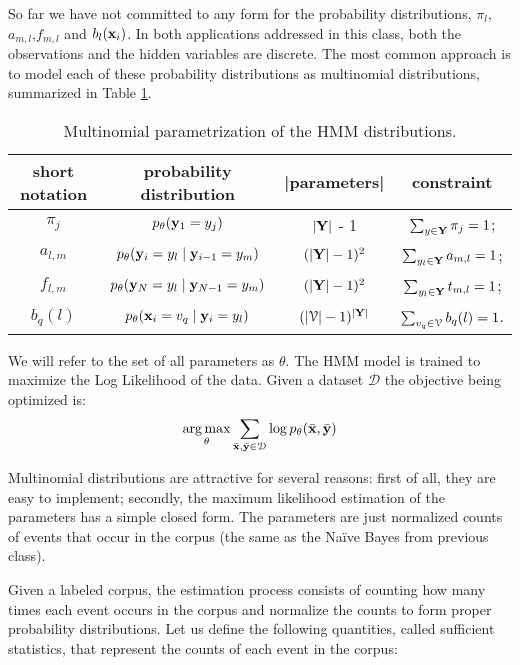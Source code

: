 So far we have not committed to any form for the probability
distributions, $\pi_l$, $a_{m,l}$,$f_{m,l}$ and $b_l(\mathbf{x}_i)$. In both applications
addressed in this class, both the observations and the hidden
variables are discrete. The most common approach is to model each of
these probability distributions as multinomial distributions,
summarized in Table \ref{tt:mult-params}.
\begin{table}
\begin{center}
\begin{tabular}{|c|c|c|c|}
\hline
short notation & probability distribution  & |parameters|& constraint \\
\hline
$\pi_j$ & $p_{\theta} (\mathbf{y}_1 = {y}_j)$ & $|\mathbf{Y}|$ - 1 & $\sum_{{y} \in \mathbf{Y}} \pi_j = 1$;\\
\hline
$a_{l,m}$ & $p_{\theta} (\mathbf{y}_i = {y}_l \mid \mathbf{y}_{i-1} = {y}_m)$ & $(|\mathbf{Y}|-1)^2$ &$\sum_{{y}_l \in \mathbf{Y}} a_{m,l} = 1$;\\
\hline
$f_{l,m}$ & $p_{\theta} (\mathbf{y}_N = {y}_l \mid \mathbf{y}_{N-1} = {y}_m)$ & $(|\mathbf{Y}|-1)^2$ &$\sum_{{y}_l \in \mathbf{Y}} t_{m,l} = 1$;\\
\hline
$b_q(l) $& $p_{\theta}(\mathbf{x}_i = {v}_q\mid \mathbf{y}_i = {y}_l)$  & $(|\mathcal{V}|-1)^{|\mathbf{Y}|}$ &$\sum_{{v}_q \in \mathcal{V}} b_q(l)  = 1$.\\
\hline
\end{tabular}
\end{center}
\caption[HMM multinomial parametrization]{\label{tt:mult-params}Multinomial parametrization of the HMM distributions.}
\end{table}

We will refer to the set of all parameters as $\theta$. The HMM model
is trained to maximize the Log Likelihood of the data. Given a
dataset $\mathcal{D}$ the objective being optimized is:
\begin{equation}
\operatorname*{arg\,max}_{\theta} \sum_{\bar{\mathbf{x}},\bar{\mathbf{y}} \in \mathcal{D}} \log p_{\theta}(\bar{\mathbf{x}} ,\bar{\mathbf{y}})
\end{equation}


Multinomial distributions are attractive for several reasons: first of
all, they are easy to implement; secondly, the maximum likelihood estimation of the parameters has a simple closed form. The parameters are just
normalized counts of events that occur in the corpus (the same as the
Na\"{i}ve Bayes from previous class).

Given a labeled corpus, the estimation process consists of counting how
many times each event occurs in the corpus and normalize the counts to
form proper probability distributions. Let us define the following
quantities, called sufficient statistics, that represent the counts of
each event in the corpus:

